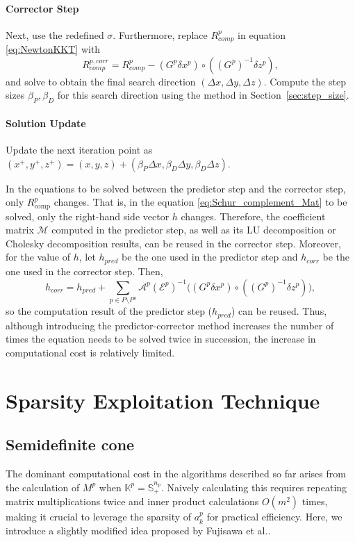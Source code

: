 \documentclass{scrartcl}
\begin{document}
\paragraph{Corrector Step}
Next, use the redefined $\sigma$. Furthermore, replace $R^p_{comp}$ in equation \eqref{eq:NewtonKKT} with
\[R^{p, corr}_{comp}=R^p_{comp}-(G^p \delta x^p)\circ((G^p)^{-1} \delta z^p),\]
and solve to obtain the final search direction $(\Delta x, \Delta y, \Delta z)$.
Compute the step sizes $\beta_P, \beta_D$ for this search direction using the method in Section~\ref{sec:step_size}.

\paragraph{Solution Update}
Update the next iteration point as $(x^+, y^+, z^+) = (x, y, z) + (\beta_P \Delta x, \beta_D \Delta y, \beta_D \Delta z)$.

In the equations to be solved between the predictor step and the corrector step, only $R^p_{\mathrm{comp}}$ changes.
That is, in the equation \eqref{eq:Schur_complement_Mat} to be solved, only the right-hand side vector $h$ changes.
Therefore, the coefficient matrix $\mathcal{M}$ computed in the predictor step, as well as its LU decomposition or Cholesky decomposition results, can be reused in the corrector step.
Moreover, for the value of $h$, let $h_{pred}$ be the one used in the predictor step and $h_{corr}$ be the one used in the corrector step.
Then,
\[h_{corr}=h_{pred} + \sum_{p\in P\setminus P^u} \mathcal{A}^p (\mathcal{E}^p)^{-1} \big((G^p \delta x^p) \circ ((G^p)^{-1} \delta z^p) \big),\]
so the computation result of the predictor step ($h_{pred}$) can be reused.
Thus, although introducing the predictor-corrector method increases the number of times the equation needs to be solved twice in succession, the increase in computational cost is relatively limited.


\medskip

\section{Sparsity Exploitation Technique} \label{sec:exploit_sparsity}
\subsection{Semidefinite cone} \label{sec:exploit_sparsity_sdp}
The dominant computational cost in the algorithms described so far arises from the calculation of $M^p$ when $\mathbb{K}^p = \mathbb{S}^{n_p}_+$. 
Naively calculating this requires repeating matrix multiplications twice and inner product calculations $O(m^2)$ times, making it crucial to leverage the sparsity of $a^p_k$ for practical efficiency. 
Here, we introduce a slightly modified idea proposed by Fujisawa et al.\cite{Fujisawa1997}.
\end{document}

